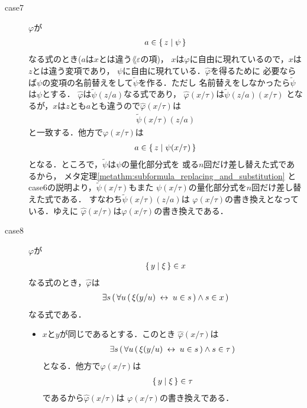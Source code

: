 \begin{metaprf}[第一]
\begin{description}
\begin{description}
					\item[case7] $\varphi$が
						\begin{align}
							a \in \{\, z \mid \psi\, \}
						\end{align}
						なる式のとき($a$は$x$とは違う$\lang{\varepsilon}$の項)，
						$x$は$\varphi$に自由に現れているので，$x$は$z$とは違う変項であり，
						$\psi$に自由に現れている．$\widehat{\varphi}$を得るために
						必要ならば$\psi$の変項の名前替えをして$\widetilde{\psi}$を作る．ただし
						名前替えをしなかったら$\widetilde{\psi}$は$\psi$とする．
						$\widehat{\varphi}$は$\widetilde{\psi}(z/a)$なる式であり，
						$\widehat{\varphi}(x/\tau)$は$\widetilde{\psi}(z/a)(x/\tau)$
						となるが，$x$は$z$とも$a$とも違うので$\widehat{\varphi}(x/\tau)$は
						\begin{align}
							\widetilde{\psi}(x/\tau)(z/a)
						\end{align}
						と一致する．他方で$\varphi(x/\tau)$は
						\begin{align}
							a \in \{\, z \mid \psi(x/\tau)\, \}
						\end{align}
						となる．ところで，$\widetilde{\psi}$は$\psi$の量化部分式を
						或る$n$回だけ差し替えた式であるから，
						メタ定理\ref{metathm:subformula_replacing_and_substitution}
						とcase6の説明より，$\widetilde{\psi}(x/\tau)$もまた
						$\psi(x/\tau)$の量化部分式を$n$回だけ差し替えた式である．
						すなわち$\widetilde{\psi}(x/\tau)(z/a)$は
						$\varphi(x/\tau)$の書き換えとなっている．ゆえに
						$\widehat{\varphi}(x/\tau)$は$\varphi(x/\tau)$の書き換えである．
						
					\item[case8] $\varphi$が
						\begin{align}
							\{\, y \mid \xi\, \} \in x
						\end{align}
						なる式のとき，$\widehat{\varphi}$は
						\begin{align}
							\exists s\, (\, \forall u\, (\, \xi(y/u) \hspace{0.25em}\leftrightarrow\hspace{0.25em} u \in s\, ) \wedge s \in x\, )
						\end{align}
						なる式である．
						\begin{itemize}
							\item $x$と$y$が同じであるとする．このとき
								$\widehat{\varphi}(x/\tau)$は
								\begin{align}
									\exists s\, (\, \forall u\, (\, \xi(y/u) \hspace{0.25em}\leftrightarrow\hspace{0.25em} u \in s\, ) \wedge s \in \tau\, )
								\end{align}
								となる．他方で$\varphi(x/\tau)$は
								\begin{align}
									\{\, y \mid \xi\, \} \in \tau
								\end{align}
								であるから$\widehat{\varphi}(x/\tau)$は
								$\varphi(x/\tau)$の書き換えである．
								

\end{itemize}
\end{description}
\end{description}
\end{metaprf}
